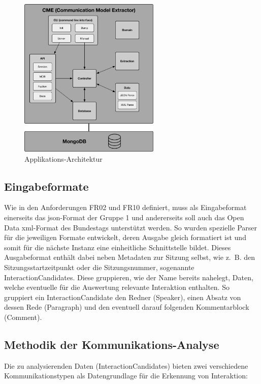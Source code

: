 \begin{figure}[ht]
    \begin{center}
        \includegraphics[width=0.6\textwidth]{images/03-cme/Project-Modules.pdf}
    \end{center}
    \caption{Applikations-Architektur}
    \label{fig:03_project_structure}
\end{figure}

\subsection{Eingabeformate}
Wie in den Anforderungen FR02 und FR10 definiert, muss als Eingabeformat
einerseits das \gls{json}-Format der Gruppe 1 und andererseits soll auch das
Open Data \gls{xml}-Format des Bundestags unterstützt werden. So wurden
spezielle Parser für die jeweiligen Formate entwickelt, deren Ausgabe gleich
formatiert ist und somit für die nächste Instanz eine einheitliche
Schnittstelle bildet. Dieses Ausgabeformat enthält dabei neben Metadaten zur
Sitzung selbst, wie z.~B. den Sitzungsstartzeitpunkt oder die Sitzungsnummer,
sogenannte InteractionCandidates. Diese gruppieren, wie der Name bereits
nahelegt, Daten, welche eventuelle für die Auswertung relevante Interaktion
enthalten. So gruppiert ein InteractionCandidate den Redner (Speaker),
einen Absatz von dessen Rede (Paragraph) und den eventuell darauf folgenden
Kommentarblock (Comment).

\subsection{Methodik der Kommunikations-Analyse}
Die zu analysierenden Daten (InteractionCandidates) bieten zwei verschiedene
Kommunikationstypen als Datengrundlage für die Erkennung von Interaktion:

